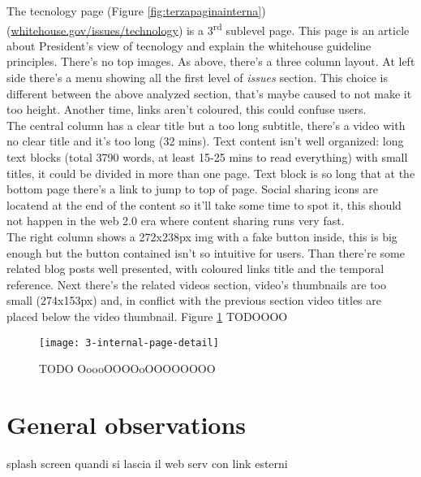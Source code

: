 \documentclass[
12pt, %
a4paper, %
oneside, %
headinclude,footinclude, %
BCOR5mm, %
]{scrartcl}
\begin{document}
	The tecnology page (Figure \ref{fig:terzapaginainterna}) (\href{http://www.whitehouse.gov/issues/technology}{whitehouse.gov/issues/technology}) is a 3\textsuperscript{rd} sublevel page. This page is an article about President's view of tecnology and explain the whitehouse guideline principles. There's no top images. As above, there's a three column layout. At left side there's a menu showing all the first level of \emph{issues} section. This choice is different between the above analyzed section, that's maybe caused to not make it too height. Another time, links aren't coloured, this could confuse users. \\
	The central column has a clear title but a too long subtitle, there's a video with no clear title and it's too long (32 mins). Text content isn't well organized: long text blocks (total 3790 words, at least 15-25 mins to read everything) with small titles, it could be divided in more than one page. Text block is so long that at the bottom page there's a link to jump to top of page. Social sharing icons are locatend at the end of the content so it'll take some time to spot it, this should not happen in the web 2.0 era where content sharing runs very fast. \\
	The right column shows a 272x238px img with a fake button inside, this is big enough but the button contained isn't so intuitive for users. Than there're some related blog posts well presented, with coloured links title and the temporal reference. Next there's the related videos section, video's thumbnails are too small (274x153px) and, in conflict with the previous section video titles are placed below the video thumbnail.
	Figure 	\ref{fig:terzapaginainternadettaglio} TODOOOO


	\begin{figure}[h!]
	\centering 
	\centerline{\texttt{[image: 3-internal-page-detail]}}
	\caption[]{TODO OoooOOOOoOOOOOOOO}
	\label{fig:terzapaginainternadettaglio} 
	\end{figure}
	


\newpage
\section{General observations}

splash screen quandi si lascia il web serv con link esterni
\end{document}
